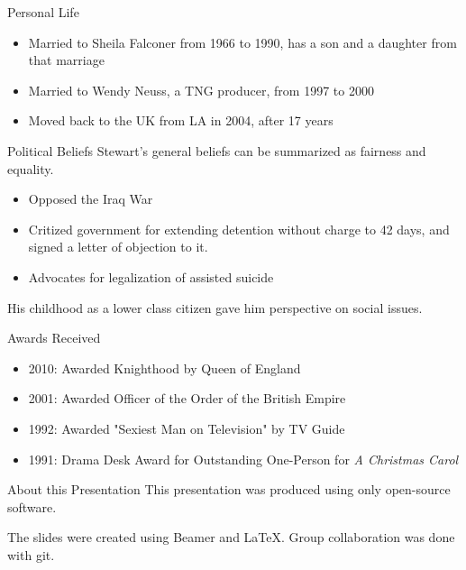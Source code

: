 \documentclass[xcolor=dvipsnames]{beamer}
\begin{document}
\begin{frame}{Personal Life}
  \begin{itemize}
    \item Married to Sheila Falconer from 1966 to 1990, has a son and a daughter
    from that marriage
    \item Married to Wendy Neuss, a TNG producer, from 1997 to 2000
    \item Moved back to the UK from LA in 2004, after 17 years
    \begin{qct}
    \end{qct}
  \end{itemize}
\end{frame}

\begin{frame}{Political Beliefs}
  Stewart's general beliefs can be summarized as fairness and equality.  
  \begin{itemize}
    \item Opposed the Iraq War
    \item Critized government for extending detention without charge to 42
    days, and signed a letter of objection to it.
    \item Advocates for legalization of assisted suicide
  \end{itemize}
  His childhood as a lower class citizen gave him perspective on social issues.

\end{frame}

\begin{frame}{Awards Received}
  \begin{itemize}
    \item 2010: Awarded Knighthood by Queen of England
    \item 2001: Awarded Officer of the Order of the British Empire
      \begin{qct}
      \end{qct}
    \item 1992: Awarded "Sexiest Man on Television" by TV Guide
    \item 1991: Drama Desk Award for Outstanding One-Person for \emph{A
    Christmas Carol}
  \end{itemize}
\end{frame}

\begin{frame}{About this Presentation}
  This presentation was produced using only open-source software.

  The slides were created using Beamer and LaTeX.
  Group collaboration was done with git.
\end{frame}
\end{document}
